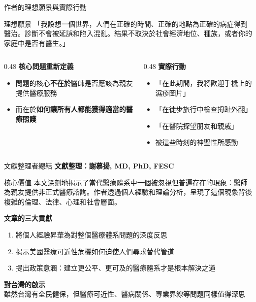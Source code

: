 \documentclass[aspectratio=169]{beamer}
\begin{document}
\begin{frame}{作者的理想願景與實際行動}
\begin{block}{\textcolor{medred}{理想願景}}
「我設想一個世界，人們在正確的時間、正確的地點為正確的病症得到醫治。診斷不會被延誤和陷入混亂。結果不取決於社會經濟地位、種族，或者你的家庭中是否有醫生。」
\end{block}

\vspace{0.5cm}

\begin{columns}
\begin{column}{0.48\textwidth}
\textbf{\textcolor{medblue}{核心問題重新定義}}
\begin{itemize}
\item 問題的核心\textbf{不在於}醫師是否應該為親友提供醫療服務
\item 而在於\textbf{如何讓所有人都能獲得適當的醫療照護}
\end{itemize}
\end{column}

\begin{column}{0.48\textwidth}
\textbf{\textcolor{medblue}{實際行動}}
\begin{itemize}
\item 「在此期間，我將歡迎手機上的濕疹圖片」
\item 「在徒步旅行中檢查拇趾外翻」
\item 「在醫院探望朋友和親戚」
\item 被這些時刻的神聖性所感動
\end{itemize}
\end{column}
\end{columns}
\end{frame}

\begin{frame}{文獻整理者總結}
\textbf{\textcolor{medred}{文獻整理：謝慕揚, MD, PhD, FESC}}

\begin{block}{核心價值}
本文深刻地揭示了當代醫療體系中一個被忽視但普遍存在的現象：醫師為親友提供非正式醫療諮詢。作者透過個人經驗和理論分析，呈現了這個現象背後複雜的倫理、法律、心理和社會層面。
\end{block}

\vspace{0.3cm}

\textbf{\textcolor{medblue}{文章的三大貢獻}}
\begin{enumerate}
\item 將個人經驗昇華為對整個醫療體系問題的深度反思
\item 揭示美國醫療可近性危機如何迫使人們尋求替代管道
\item 提出政策意涵：建立更公平、更可及的醫療體系才是根本解決之道
\end{enumerate}

\vspace{0.3cm}

\textbf{\textcolor{medred}{對台灣的啟示}}\\
雖然台灣有全民健保，但醫療可近性、醫病關係、專業界線等問題同樣值得深思
\end{frame}
\end{document}
